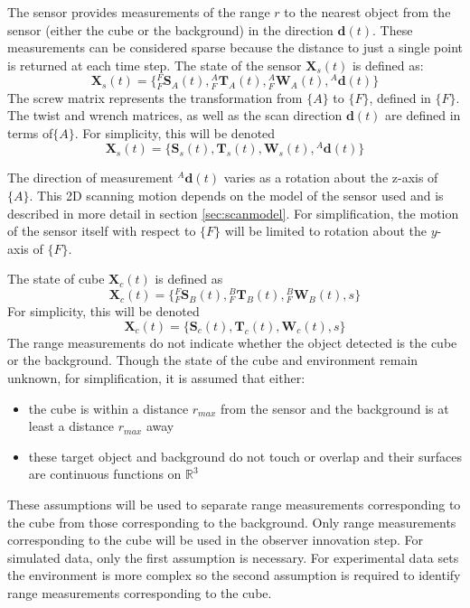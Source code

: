 The sensor provides measurements of the range $r$ to the nearest object from the sensor (either the cube or the background) in the direction $\mathbf{d}(t)$. These measurements can be considered sparse because the distance to just a single point is returned at each time step. The state of the sensor $\mathbf{X}_{s}(t)$ is defined as:
\begin{equation}
	\mathbf{X}_{s}(t) = 
	\{{^{F}_{F}\mathbf{S}^{}_{A}(t)},{^{A}_{F}\mathbf{T}^{}_{A}(t)},{^{A}_{F}\mathbf{W}^{}_{A}(t)},
	{^{A}\mathbf{d}(t)}\}
\end{equation}
The screw matrix represents the transformation from $\{A\}$ to $\{F\}$, defined in $\{F\}$. The twist and wrench matrices, as well as the scan direction $\mathbf{d}(t)$ are defined in terms of$\{A\}$.
For simplicity, this will be denoted 
\begin{equation}
	\mathbf{X}_{s}(t) = 
	\{\mathbf{S}_{s}(t),\mathbf{T}_{s}(t),\mathbf{W}_{s}(t),{^{A}\mathbf{d}(t)}\}
\end{equation}

The direction of measurement ${^{A}\mathbf{d}(t)}$ varies as a rotation about the z-axis of $\{A\}$. This 2D scanning motion depends on the model of the sensor used and is described in more detail in section \ref{sec:scanmodel}. For simplification, the motion of the sensor itself with respect to $\{F\}$ will be limited to rotation about the $y$-axis of $\{F\}$.

The state of cube $\mathbf{X}_{c}(t)$ is defined as 
\begin{equation}
	\mathbf{X}_{c}(t) = 
	\{{^{F}_{F}\mathbf{S}^{}_{B}(t)},{^{B}_{F}\mathbf{T}^{}_{B}(t)},{^{B}_{F}\mathbf{W}^{}_{B}(t)},
	s\}
\end{equation}
For simplicity, this will be denoted
\begin{equation}
	\mathbf{X}_{c}(t) = 
	\{\mathbf{S}_{c}(t),\mathbf{T}_{c}(t),\mathbf{W}_{c}(t),s\}
\end{equation}
The range measurements do not indicate whether the object detected is the cube or the background. Though the state of the cube and environment remain unknown, for simplification, it is assumed that either:
\begin{itemize}
\item the cube is within a distance $r_{max}$ from the sensor and the background is at least a distance $r_{max}$ away
\item these target object and background do not touch or overlap and their surfaces are continuous functions on $\mathbb{R}^3$
\end{itemize}
These assumptions will be used to separate range measurements corresponding to the cube from those corresponding to the background. Only range measurements corresponding to the cube will be used in the observer innovation step. For simulated data, only the first assumption is necessary. For experimental data sets the environment is more complex so the second assumption is required to identify range measurements corresponding to the cube. 

